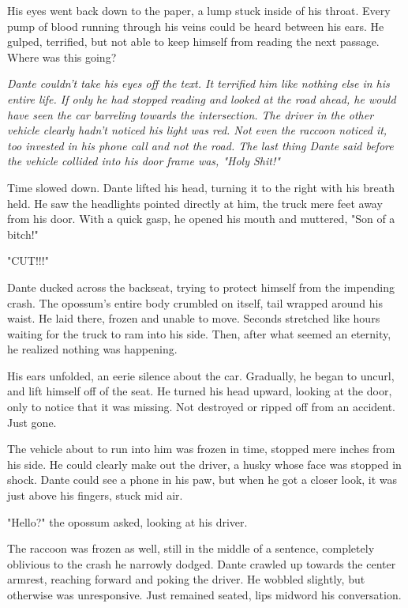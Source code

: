 His eyes went back down to the paper, a lump stuck inside of his throat. Every pump of blood running through his veins could be heard between his ears. He gulped, terrified, but not able to keep himself from reading the next passage. Where was this going?

\emph{Dante couldn't take his eyes off the text. It terrified him like nothing else in his entire life. If only he had stopped reading and looked at the road ahead, he would have seen the car barreling towards the intersection. The driver in the other vehicle clearly hadn't noticed his light was red. Not even the raccoon noticed it, too invested in his phone call and not the road. The last thing Dante said before the vehicle collided into his door frame was, "Holy Shit!"}

Time slowed down. Dante lifted his head, turning it to the right with his breath held. He saw the headlights pointed directly at him, the truck mere feet away from his door. With a quick gasp, he opened his mouth and muttered, "Son of a bitch!"

"CUT!!!"

Dante ducked across the backseat, trying to protect himself from the impending crash. The opossum's entire body crumbled on itself, tail wrapped around his waist. He laid there, frozen and unable to move. Seconds stretched like hours waiting for the truck to ram into his side. Then, after what seemed an eternity, he realized nothing was happening.

His ears unfolded, an eerie silence about the car. Gradually, he began to uncurl, and lift himself off of the seat. He turned his head upward, looking at the door, only to notice that it was missing. Not destroyed or ripped off from an accident. Just gone.

The vehicle about to run into him was frozen in time, stopped mere inches from his side. He could clearly make out the driver, a husky whose face was stopped in shock. Dante could see a phone in his paw, but when he got a closer look, it was just above his fingers, stuck mid air.

"Hello?" the opossum asked, looking at his driver.

The raccoon was frozen as well, still in the middle of a sentence, completely oblivious to the crash he narrowly dodged. Dante crawled up towards the center armrest, reaching forward and poking the driver. He wobbled slightly, but otherwise was unresponsive. Just remained seated, lips midword his conversation.

